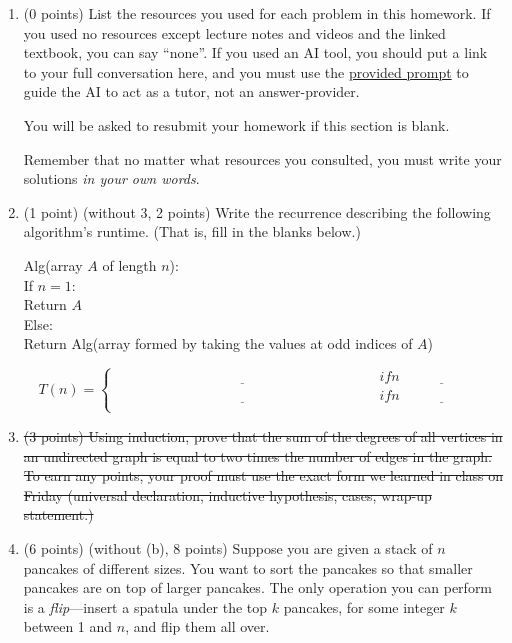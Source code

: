 \documentclass[11pt]{article}
\begin{document}


\begin{enumerate}


\item (0 points) List the resources you used for each problem in this homework. If you used no resources except
lecture notes and videos and the linked textbook, you can say ``none''. If you used
an AI tool, you should put a link to your full conversation here, and you must
use the
\href{https://umaal.org/files/teaching/csci332_fall2026/agents.md}{provided
prompt}
 to guide the AI to act
as a tutor, not an answer-provider.

You will be asked to resubmit your homework if this section is blank.

Remember that no matter what resources you consulted, you must write your solutions
\emph{in your own words}.

\item (1 point) (without 3, 2 points) Write the recurrence describing the following algorithm's runtime.
(That is, fill in the blanks below.)

\begin{algo}
    Alg(array $A$ of length $n$):\+ \\
        If $n = 1$: \+ \\
            Return $A$ \- \\
        Else: \+ \\
            Return Alg(array formed by taking the values at odd indices of $A$)
\end{algo}

    \begin{equation*}
        T(n) =
        \begin{cases}
        \underline{\hspace{3in}} & if n \underline{\hspace{1in}} \\
        \underline{\hspace{3in}} & if n \underline{\hspace{1in}} \\
        \end{cases}
    \end{equation*}
\item \sout{(3 points) Using induction, prove that the sum of the degrees of all vertices in an
undirected graph is equal to two times the number of edges in the graph.
To earn any points, your proof must use the exact form we learned in class on
Friday (universal declaration, inductive hypothesis, cases, wrap-up statement.)}
\item (6 points) (without (b), 8 points) Suppose you are given a stack of $n$ pancakes of different sizes. You want to
sort the pancakes so that smaller pancakes are on top of larger pancakes.
The only operation you can perform is a \emph{flip}---insert a spatula
under the top $k$ pancakes, for some integer $k$ between 1 and $n$, and flip them all over.


\end{enumerate}
\end{document}
